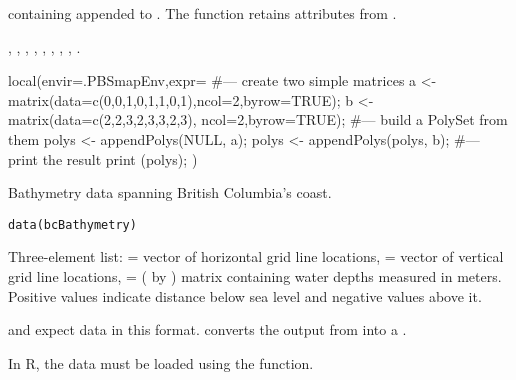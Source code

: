 \documentclass[letterpaper]{book}
\begin{document}
%
\begin{Value}
 containing  appended to .  The
function retains attributes from .
\end{Value}
%
\begin{SeeAlso}\relax
{},
,
,
,
,
,
,
,
.
\end{SeeAlso}
%
\begin{Examples}
\begin{ExampleCode}
local(envir=.PBSmapEnv,expr={
  #--- create two simple matrices
  a <- matrix(data=c(0,0,1,0,1,1,0,1),ncol=2,byrow=TRUE);
  b <- matrix(data=c(2,2,3,2,3,3,2,3), ncol=2,byrow=TRUE);
  #--- build a PolySet from them
  polys <- appendPolys(NULL, a);
  polys <- appendPolys(polys, b);
  #--- print the result
  print (polys);
})
\end{ExampleCode}
\end{Examples}
%
\begin{Description}\relax
Bathymetry data spanning British Columbia's coast.
\end{Description}
%
\begin{Usage}
\begin{verbatim}
data(bcBathymetry)
\end{verbatim}
\end{Usage}
%
\begin{Format}
Three-element list:  = vector of horizontal grid line
locations,  = vector of vertical grid line locations, 
= ( by ) matrix containing water depths measured in
meters.  Positive values indicate distance below sea level and
negative values above it.

 and  expect data in
this format.   converts the output from
 into a .
\end{Format}
%
\begin{Note}\relax
In R, the data must be loaded using the  function.
\end{Note}
\end{document}
